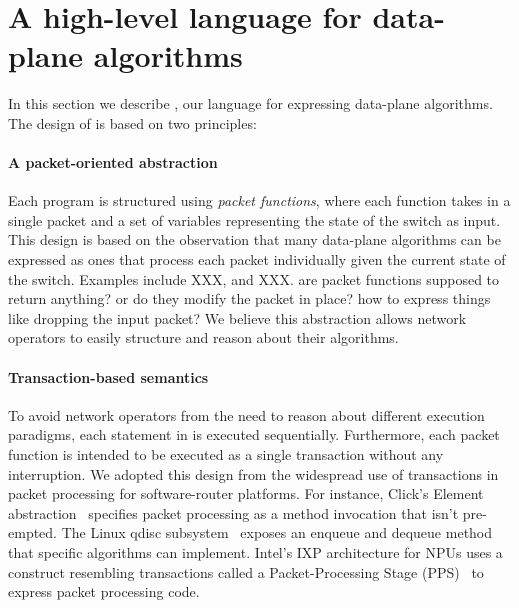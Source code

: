 \section{A high-level language for data-plane algorithms}
\label{s:language}

In this section we describe \pktlanguage, our language for expressing 
data-plane algorithms. The design of \pktlanguage is based on two principles:

\paragraph{A packet-oriented abstraction} 
Each \pktlanguage program is structured using
{\em packet functions}, where each function takes in a single packet
and a set of variables representing the state of the switch as input.
This design is based on the observation that many data-plane algorithms can
be expressed as ones that process each packet individually given the current 
state of the switch. Examples include XXX, and XXX. \ac{are packet functions
supposed to return anything? or do they modify the packet in place? how to 
express things like dropping the input packet?}
We believe this abstraction allows network operators to easily structure
and reason about their algorithms.

\paragraph{Transaction-based semantics} 
To avoid network operators from the need to reason about different execution
paradigms, each statement in \pktlanguage is executed sequentially.
Furthermore, each \pktlanguage packet function is intended to be executed
as a single transaction without any interruption. We adopted this design
from the widespread use of transactions 
in packet processing for software-router platforms. For instance,
Click's Element abstraction~\cite{click} specifies packet processing as
a method invocation that isn't pre-empted.  The Linux qdisc
subsystem~\cite{qdisc} exposes an enqueue and dequeue method that specific
algorithms can implement. Intel's IXP architecture for NPUs uses a construct
resembling transactions called a Packet-Processing Stage
(PPS)~\cite{npu} to express packet processing code.

